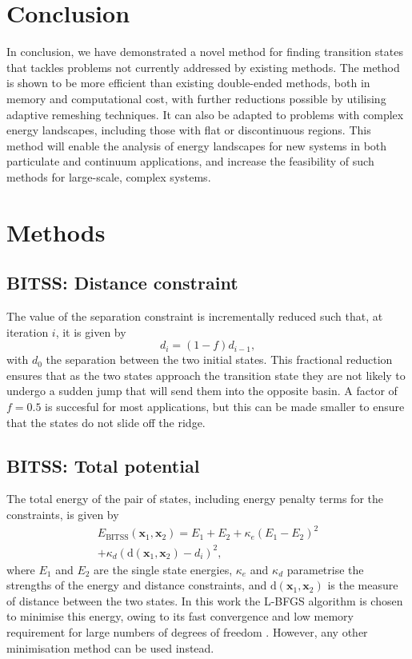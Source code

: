 \documentclass[twocolumn,10pt]{revtex4-2}
\begin{document}
\section{Conclusion}
In conclusion, we have demonstrated a novel method for finding transition states that tackles problems not currently addressed by existing methods.
The method is shown to be more efficient than existing double-ended methods, both in memory and computational cost, with further reductions possible by utilising adaptive remeshing techniques.
It can also be adapted to problems with complex energy landscapes, including those with flat or discontinuous regions.
This method will enable the analysis of energy landscapes for new systems in both particulate and continuum applications, and increase the feasibility of such methods for large-scale, complex systems.


\section{Methods}
\subsection{BITSS: Distance constraint}
The value of the separation constraint is incrementally reduced such that, at iteration $i$, it is given by
\begin{equation}\label{eq:diteration}
  d_i = (1 - f) d_{i-1},
\end{equation}
with $d_0$ the separation between the two initial states.
This fractional reduction ensures that as the two states approach the transition state they are not likely to undergo a sudden jump that will send them into the opposite basin.
A factor of $f = 0.5$ is succesful for most applications, but this can be made smaller to ensure that the states do not slide off the ridge.

\subsection{BITSS: Total potential}
The total energy of the pair of states, including energy penalty terms for the constraints, is given by
\begin{multline}\label{eq:bitss}
  E_\text{BITSS}(\bm{x}_1, \bm{x}_2) = E_1 + E_2
    + \kappa_e \left( E_1 - E_2 \right) ^2 \\
    + \kappa_d \left( \mathrm{d}(\bm{x}_1, \bm{x}_2) - d_i \right) ^2,
\end{multline}
where $E_1$ and $E_2$ are the single state energies, $\kappa_e$ and $\kappa_d$ parametrise the strengths of the energy and distance constraints, and $\mathrm{d}(\bm{x}_1, \bm{x}_2)$ is the measure of distance between the two states.
In this work the L-BFGS algorithm is chosen to minimise this energy, owing to its fast convergence and low memory requirement for large numbers of degrees of freedom \cite{Liu1989}.
However, any other minimisation method can be used instead.
\end{document}
